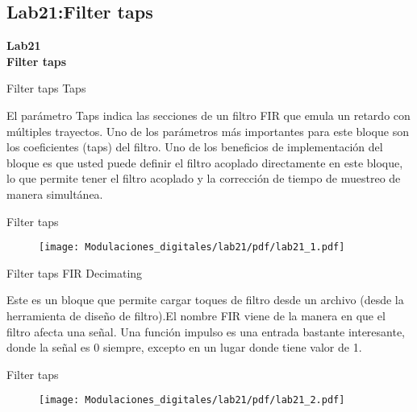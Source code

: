 \subsection{Lab21:Filter taps}

\begin{frame}{}


\bfseries{\textrm{\LARGE Lab21\\ \Large Filter taps}}
\raggedright
\end{frame}

\begin{frame}{Filter taps}
Taps
\begin{flushleft}
El parámetro Taps indica las secciones de un filtro FIR que emula un retardo con múltiples trayectos.
Uno de los parámetros más importantes  para este bloque son los coeficientes (taps) del filtro. Uno de los beneficios de implementación del bloque es que usted puede definir el filtro acoplado directamente en este bloque, lo que permite tener el filtro acoplado y la corrección de tiempo de muestreo de manera simultánea.
\end{flushleft}
\end{frame}


\begin{frame}{Filter taps}
\begin{figure}[H]
\centering
\texttt{[image: Modulaciones\_digitales/lab21/pdf/lab21\_1.pdf]}
\end{figure}
\end{frame}

\begin{frame}{Filter taps}
FIR Decimating
\begin{flushleft}
Este es un bloque que permite cargar toques de filtro desde un archivo (desde la herramienta de diseño de filtro).El nombre FIR viene de la manera en que el filtro afecta una señal. Una función impulso es una entrada bastante interesante, donde la señal es 0 siempre, excepto en un lugar donde tiene valor de 1.
\end{flushleft}
\end{frame}


\begin{frame}{Filter taps}
\begin{figure}[H]
\centering
\vspace{-3mm}
\texttt{[image: Modulaciones\_digitales/lab21/pdf/lab21\_2.pdf]}
\end{figure}
\end{frame}

